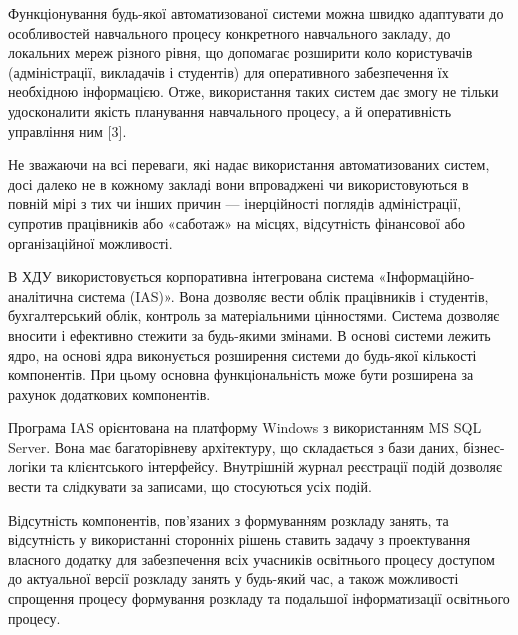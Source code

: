 Функціонування будь-якої автоматизованої системи можна швидко адаптувати до особливостей навчального процесу конкретного навчального закладу, до локальних мереж різного рівня, що допомагає розширити коло користувачів (адміністрації, викладачів і студентів) для оперативного забезпечення їх необхідною інформацією. Отже, використання таких систем дає змогу не тільки удосконалити якість планування навчального процесу, а й оперативність управління ним [3].

Не зважаючи на всі переваги, які надає використання автоматизованих систем, досі далеко не в кожному закладі вони впроваджені чи використовуються в повній мірі з тих чи інших причин — інерційності поглядів адміністрації, супротив працівників або «саботаж» на місцях, відсутність фінансової або організаційної можливості.

В ХДУ використовується корпоративна інтегрована система «Інформаційно-аналітична система (IAS)». Вона дозволяє вести облік працівників і студентів, бухгалтерський облік, контроль за матеріальними цінностями. 		
Система дозволяє вносити і ефективно стежити за будь-якими змінами. В основі системи лежить ядро, на основі ядра виконується розширення системи до будь-якої кількості компонентів. При цьому основна функціональність може бути розширена за рахунок додаткових компонентів. 

Програма IAS орієнтована на платформу Windows з використанням MS SQL Server. Вона має багаторівневу архітектуру, що складається з бази даних, бізнес-логіки та клієнтського інтерфейсу. Внутрішній журнал реєстрації подій дозволяє вести та слідкувати за записами, що стосуються усіх подій.

Відсутність компонентів, пов’язаних з формуванням розкладу занять, та відсутність у використанні сторонніх рішень ставить задачу з проектування власного додатку для забезпечення всіх учасників освітнього процесу доступом до актуальної версії розкладу занять у будь-який час, а також можливості спрощення процесу формування розкладу та подальшої інформатизації освітнього процесу.

\clearpage